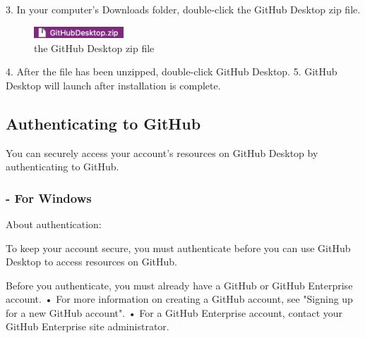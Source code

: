 3.	In your computer's Downloads folder, double-click the GitHub Desktop zip file.
\begin{figure}[ht]
    \centering
    \includegraphics[width=0.3\textwidth]{figures/the GitHub Desktop zip file.png}
    \caption{the GitHub Desktop zip file}
\end{figure}

4.	After the file has been unzipped, double-click GitHub Desktop.
5.	GitHub Desktop will launch after installation is complete.



\subsection{Authenticating to GitHub }

You can securely access your account's resources on GitHub Desktop by authenticating to GitHub.

\subsubsection{- For Windows }

About authentication:

To keep your account secure, you must authenticate before you can use GitHub Desktop to access resources on GitHub.

Before you authenticate, you must already have a GitHub or GitHub Enterprise account.
•	For more information on creating a GitHub account, see "Signing up for a new GitHub account".
•	For a GitHub Enterprise account, contact your GitHub Enterprise site administrator.

